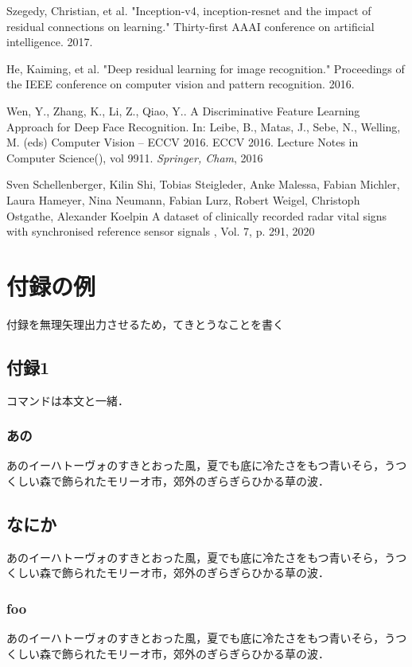 \begin{bib}[100]
Szegedy, Christian, et al. "Inception-v4, inception-resnet and the impact of residual connections on learning." Thirty-first AAAI conference on artificial intelligence. 2017.

He, Kaiming, et al. "Deep residual learning for image recognition." Proceedings of the IEEE conference on computer vision and pattern recognition. 2016.

Wen, Y., Zhang, K., Li, Z., Qiao, Y.. A Discriminative Feature Learning Approach for Deep Face Recognition. In: Leibe, B., Matas, J., Sebe, N., Welling, M. (eds) Computer Vision – ECCV 2016. ECCV 2016. Lecture Notes in Computer Science(), vol 9911. {\it Springer, Cham}, 2016

Sven Schellenberger, Kilin Shi, Tobias Steigleder, Anke Malessa, Fabian Michler, Laura Hameyer, Nina Neumann, Fabian Lurz, Robert Weigel, Christoph Ostgathe, Alexander Koelpin
\newblock A dataset of clinically recorded radar vital signs with synchronised reference sensor signals
, Vol. 7, p. 291, 2020

\end{bib}

\appendix
\chapter{付録の例}

付録を無理矢理出力させるため，てきとうなことを書く

\section{付録1}

コマンドは本文と一緒．

\subsection{あの}

あのイーハトーヴォのすきとおった風，夏でも底に冷たさをもつ青いそら，うつくしい森で飾られたモリーオ市，郊外のぎらぎらひかる草の波．

\section{なにか}

あのイーハトーヴォのすきとおった風，夏でも底に冷たさをもつ青いそら，うつくしい森で飾られたモリーオ市，郊外のぎらぎらひかる草の波．

\subsection{foo}

あのイーハトーヴォのすきとおった風，夏でも底に冷たさをもつ青いそら，うつくしい森で飾られたモリーオ市，郊外のぎらぎらひかる草の波．



